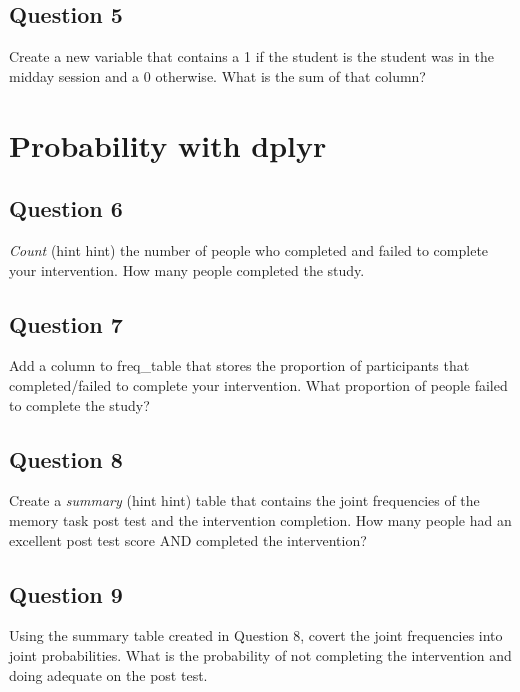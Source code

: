 \documentclass[]{book}
\theoremstyle{definition}
\theoremstyle{definition}
\theoremstyle{definition}
\theoremstyle{remark}
\begin{document}
\hypertarget{question-5}{%
\subsection{Question 5}\label{question-5}}

Create a new variable that contains a 1 if the student is the student was in the midday session and a 0 otherwise. What is the sum of that column?

\hypertarget{probability-with-dplyr}{%
\section{Probability with dplyr}\label{probability-with-dplyr}}

\hypertarget{question-6}{%
\subsection{Question 6}\label{question-6}}

\emph{Count} (hint hint) the number of people who completed and failed to complete your intervention. How many people completed the study.

\hypertarget{question-7}{%
\subsection{Question 7}\label{question-7}}

Add a column to freq\_table that stores the proportion of participants that completed/failed to complete your intervention. What proportion of people failed to complete the study?

\hypertarget{question-8}{%
\subsection{Question 8}\label{question-8}}

Create a \emph{summary} (hint hint) table that contains the joint frequencies of the memory task post test and the intervention completion. How many people had an excellent post test score AND completed the intervention?

\hypertarget{question-9}{%
\subsection{Question 9}\label{question-9}}

Using the summary table created in Question 8, covert the joint frequencies into joint probabilities. What is the probability of not completing the intervention and doing adequate on the post test.
\end{document}
